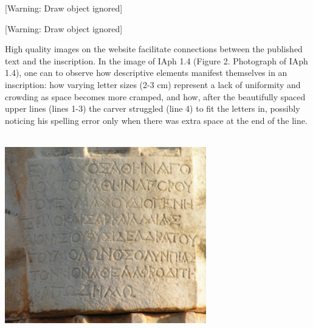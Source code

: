 \documentclass[amsthm,ebook]{saparticle}
\begin{document}
\bigskip


\bigskip


\bigskip

[Warning: Draw object ignored]

[Warning: Draw object ignored]


\bigskip


\bigskip


\bigskip


\bigskip


\bigskip


\bigskip


\bigskip


\bigskip


\bigskip


\bigskip


\bigskip


\bigskip

High quality images on the website facilitate connections between the published text and the inscription. In the image
of IAph 1.4 (Figure 2. Photograph of IAph 1.4), one can to observe how descriptive elements manifest themselves in an
inscription: how varying letter sizes (2-3 cm) represent a lack of uniformity and crowding as space becomes more
cramped, and how, after the beautifully spaced upper lines (lines 1-3) the carver struggled (line 4) to fit the letters
in, possibly noticing his spelling error only when there was extra space at the end of the line. \ 


\bigskip


\bigskip

 \includegraphics[width=8.758cm,height=7.668cm]{PaperproposalforEAGLEfinal-img002.jpg} 


\bigskip
\end{document}
